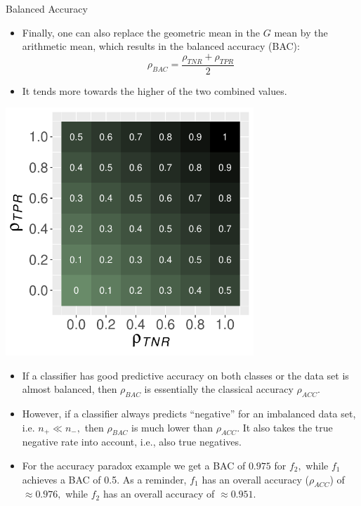 \documentclass[11pt,compress,t,notes=noshow, xcolor=table]{beamer}
\begin{document}
\begin{vbframe}{Balanced Accuracy}
	\footnotesize
	
	\begin{minipage}[c]{0.5\textwidth}
		\footnotesize
		\begin{itemize}
			\item 	Finally, one can also replace the geometric mean in the $G$ mean by the arithmetic mean, which results in the balanced accuracy (BAC): 
			$$\rho_{BAC} = \frac{\rho_{TNR} + \rho_{TPR}}{2}$$
			\item  It tends more towards the higher of the two combined values.
		\end{itemize}
	\end{minipage}%
	\begin{minipage}[c]{0.5\textwidth}
		\centering
		\includegraphics[width=0.7\textwidth]{figure/bac_plot.pdf}
	\end{minipage}
	\begin{itemize}
		\item If a classifier has good predictive accuracy on both classes or the data set is almost balanced, then $\rho_{BAC} $ is essentially the classical accuracy $\rho_{ACC}$.
%		
		\item However, if a classifier always predicts ``negative'' for an imbalanced data set, i.e. $n_+  \ll n_-,$ then $\rho_{BAC} $ is much lower than $\rho_{ACC}$.
		It also takes the true negative rate into account, i.e., also true negatives.
		\item For the accuracy paradox example we get a BAC of $0.975$ for $f_2,$ while $f_1$ achieves a BAC of 0.5. As a reminder, $f_1$ has an overall accuracy ($\rho_{ACC}$) of $\approx 0.976,$ while $f_2$ has an overall accuracy of $\approx 0.951.$
	\end{itemize}
	
\end{vbframe}
\end{document}

